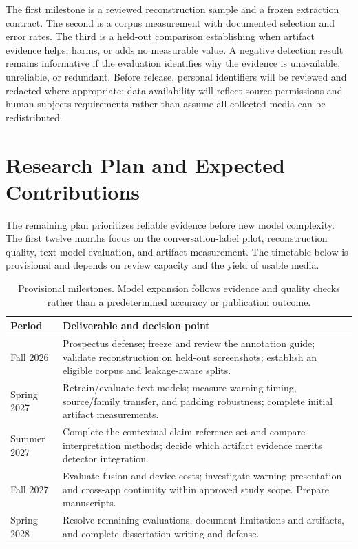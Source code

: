 \documentclass[letterpaper,11pt]{article}
\begin{document}
The first milestone is a reviewed reconstruction sample and a frozen extraction
contract. The second is a corpus measurement with documented selection and error
rates. The third is a held-out comparison establishing when artifact evidence
helps, harms, or adds no measurable value. A negative detection result remains
informative if the evaluation identifies why the evidence is unavailable,
unreliable, or redundant. Before release, personal identifiers will be reviewed
and redacted where appropriate; data availability will reflect source permissions
and human-subjects requirements rather than assume all collected media can be
redistributed.

\section{Research Plan and Expected Contributions}
\label{sec:timeline}
The remaining plan prioritizes reliable evidence before new model complexity.
The first twelve months focus on the conversation-label pilot, reconstruction
quality, text-model evaluation, and artifact measurement. The timetable below
is provisional and depends on review capacity and the yield of usable media.

\begin{table}[htbp]
\centering\small
\begin{tabularx}{\linewidth}{@{}p{.19\linewidth}X@{}}
\toprule
Period & Deliverable and decision point \\
\midrule
Fall 2026 & Prospectus defense; freeze and review the annotation guide; validate
reconstruction on held-out screenshots; establish an eligible corpus and leakage-aware splits. \\
Spring 2027 & Retrain/evaluate text models; measure warning timing, source/family
transfer, and padding robustness; complete initial artifact measurements. \\
Summer 2027 & Complete the contextual-claim reference set and compare interpretation
methods; decide which artifact evidence merits detector integration. \\
Fall 2027 & Evaluate fusion and device costs; investigate warning presentation and
cross-app continuity within approved study scope. Prepare manuscripts. \\
Spring 2028 & Resolve remaining evaluations, document limitations and artifacts,
and complete dissertation writing and defense. \\
\bottomrule
\end{tabularx}
\caption{Provisional milestones. Model expansion follows evidence and quality
checks rather than a predetermined accuracy or publication outcome.}
\end{table}
\end{document}
